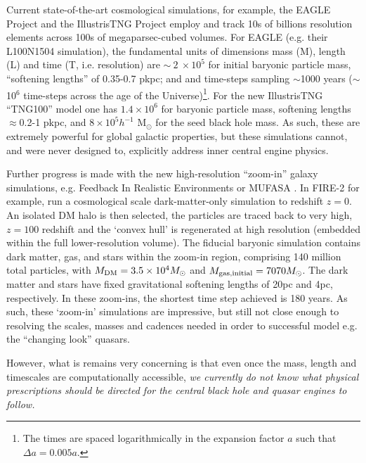 \smallskip 
\smallskip
\noindent 
Current state-of-the-art cosmological simulations, for example, the EAGLE Project \citep{Schaye2015,
Crain2015} and the IllustrisTNG Project \citep{Pillepich2018} employ
and track 10s of billions resolution elements across 100s of
megaparsec-cubed volumes.  For EAGLE (e.g. their L100N1504
simulation), the fundamental units of dimensions mass (M), length (L)
and time (T, i.e. resolution) are $\sim~2~\times10^{5}$ for initial
baryonic particle mass, ``softening lengths'' of 0.35-0.7 pkpc; and
and time-steps sampling $\sim$1000 years ($\sim$10$^{6}$ time-steps
across the age of the Universe)\footnote{The times are spaced
logarithmically in the expansion factor $a$ such that $\Delta a =
0.005a$.}. For the new IllustrisTNG ``TNG100'' model one has
$1.4\times10^{6}$ for baryonic particle mass, softening lengths $\approx$0.2-1
pkpc, and $8\times10^{5} h^{-1}$ M$_{\odot}$ for the seed black hole
mass.  As such, these are extremely powerful for global galactic
properties, but these simulations cannot, and were never designed to, explicitly
address inner central engine physics.

\smallskip 
\smallskip
\noindent 
Further progress is made with the new high-resolution ``zoom-in''
galaxy simulations, e.g. Feedback In Realistic Environments
\citep[FIRE-2;][]{Wetzel2016, Hopkins2017} or MUFASA
\citep[][]{Dave2016}.  In FIRE-2 for example, \citet{Wetzel2016} run a
cosmological scale dark-matter-only simulation to redshift $z=0$. An
isolated DM halo is then selected, the particles are traced back to
very high, $z=100$ redshift and the `convex hull' is regenerated at
high resolution (embedded within the full lower-resolution volume).
The fiducial baryonic simulation contains dark matter, gas, and stars
within the zoom-in region, comprising 140 million total particles,
with $M_{\rm DM} =3.5\times10^{4} M_{\odot}$ and $M_{\rm gas,initial}
= 7070 M_{\odot}$.  The dark matter and stars have fixed gravitational
softening lengths of 20pc and 4pc, respectively.  In these zoom-ins,
the shortest time step achieved is 180 years.  As such, these
`zoom-in' simulations are impressive, but still not close enough to
resolving the scales, masses and cadences needed in order to
successful model e.g. the ``changing look'' quasars.

\smallskip 
\smallskip
\noindent 
However, what is remains very concerning is that even once the mass,
length and timescales are computationally accessible, {\it we
currently do not know what physical prescriptions should be directed
for the central black hole and quasar engines to follow.}

